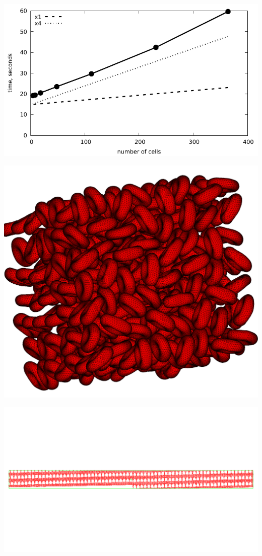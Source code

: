 \includegraphics[width=\textwidth]{i/perf.pdf}
\eframe

\bframe{}
\includegraphics[width=\textwidth]{i/many.png}
\eframe

\includegraphics[width=\textwidth]{i/pach.png}
\eframe
